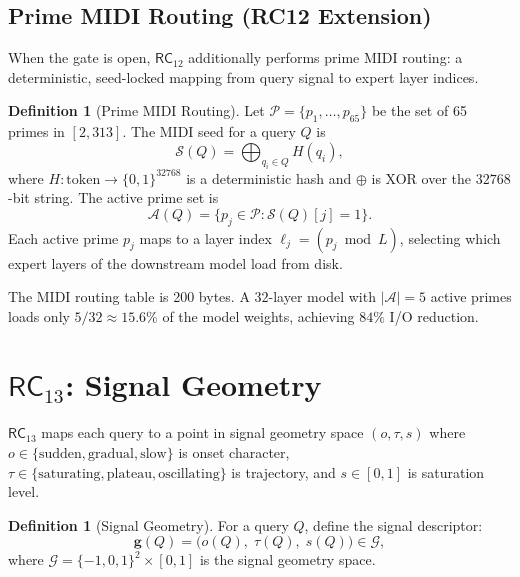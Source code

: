 \documentclass[11pt,twoside]{article}
\theoremstyle{plain}
\theoremstyle{definition}
\newtheorem{definition}[theorem]{Definition}
\theoremstyle{remark}
\newcommand{\RC}[1]{\textsf{RC}_{#1}}
\begin{document}
\subsection{Prime MIDI Routing (RC12 Extension)}

When the gate is open, $\RC{12}$ additionally performs prime MIDI routing:
a deterministic, seed-locked mapping from query signal to expert layer indices.

\begin{definition}[Prime MIDI Routing]\label{def:midi}
Let $\mathcal{P}=\{p_1,\ldots,p_{65}\}$ be the set of 65 primes in $[2,313]$.
The MIDI seed for a query $Q$ is
\begin{equation}
  \mathcal{S}(Q) = \bigoplus_{q_i\in Q} H(q_i),
\end{equation}
where $H:\mathrm{token}\to\{0,1\}^{32768}$ is a deterministic hash and
$\oplus$ is XOR over the $32768$-bit string.  The active prime set is
\begin{equation}
  \mathcal{A}(Q) = \{p_j\in\mathcal{P} : \mathcal{S}(Q)[j] = 1\}.
\end{equation}
Each active prime $p_j$ maps to a layer index $\ell_j = (p_j\bmod L)$, selecting
which expert layers of the downstream model load from disk.
\end{definition}

The MIDI routing table is 200 bytes.  A $32$-layer model with $|\mathcal{A}|=5$
active primes loads only $5/32 \approx 15.6\%$ of the model weights, achieving
$84\%$ I/O reduction.

\section{\texorpdfstring{$\RC{13}$}{RC13}: Signal Geometry}

$\RC{13}$ maps each query to a point in signal geometry space $(o, \tau, s)$
where $o\in\{\text{sudden},\text{gradual},\text{slow}\}$ is onset character,
$\tau\in\{\text{saturating},\text{plateau},\text{oscillating}\}$ is trajectory,
and $s\in[0,1]$ is saturation level.

\begin{definition}[Signal Geometry]\label{def:siggeom}
For a query $Q$, define the signal descriptor:
\begin{equation}
  \mathbf{g}(Q) = \bigl(o(Q),\;\tau(Q),\;s(Q)\bigr) \in \mathcal{G},
\end{equation}
where $\mathcal{G} = \{-1,0,1\}^2\times[0,1]$ is the signal geometry space.
\end{definition}
\end{document}
